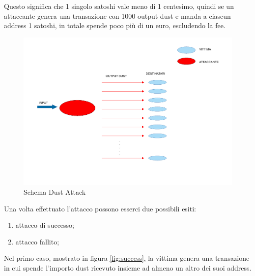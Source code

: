 Questo significa che 1 singolo satoshi vale meno di 1 centesimo, quindi se un attaccante genera una transazione con 1000 output dust e manda a ciascun address 1 satoshi, in totale spende poco più di un euro, escludendo la fee.  
\begin{figure}[h!]
    \centering
    \includegraphics[scale=0.5]{Images/dust_attack.pdf}
    \caption{Schema Dust Attack}
    \label{fig:Dust_attack}
\end{figure}
\FloatBarrier
Una volta effettuato l'attacco possono esserci due possibili esiti: 
    \begin{enumerate}
        \item attacco di successo;
        \item attacco fallito;
    \end{enumerate}
Nel primo caso, mostrato in figura \ref{fig:success}, la vittima genera una transazione in cui spende l'importo dust ricevuto insieme ad almeno un altro dei suoi address. 

